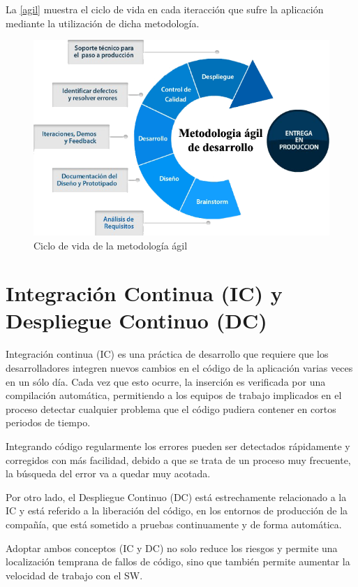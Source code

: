 La \autoref{agil} muestra el ciclo de vida en cada iteracción que sufre la aplicación mediante la utilización de dicha metodología.

\begin{figure}[htbp]
	\centering
	\includegraphics[width=1.0\linewidth]
	{tecnica/figuras/agil.png}
	\caption{Ciclo de vida de la metodología ágil}
	\label{agil}
\end{figure}

\section{Integración Continua (\gls{IC}) y Despliegue Continuo (\gls{DC})}

Integración continua (\gls{IC}) es una práctica de desarrollo que requiere que los desarrolladores integren nuevos cambios en el código de la aplicación varias veces en un sólo día. Cada vez que esto ocurre, la inserción es verificada por una compilación automática, permitiendo a los equipos de trabajo implicados en el proceso detectar cualquier problema que el código pudiera contener en cortos periodos de tiempo.

Integrando código regularmente los errores pueden ser detectados rápidamente y corregidos con más facilidad, debido a que se trata de un proceso muy frecuente, la búsqueda del error va a quedar muy acotada.

Por otro lado, el Despliegue Continuo (\gls{DC}) está estrechamente relacionado a la \gls{IC} y está referido a la liberación del código, en los entornos de producción de la compañía, que está sometido a pruebas continuamente y de forma automática.

Adoptar ambos conceptos (\gls{IC} y \gls{DC}) no solo reduce los riesgos y permite una localización temprana de fallos de código, sino que también permite aumentar la velocidad de trabajo con el \gls{SW}\cite{IC2017}.


